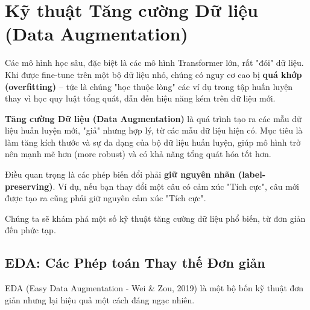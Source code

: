 
\section{Kỹ thuật Tăng cường Dữ liệu (Data Augmentation)}
\label{sec:data_augmentation}

\begin{tcolorbox}[
    title=Vấn đề: "Cơn đói" Dữ liệu,
    colback=red!5!white, colframe=red!75!black, fonttitle=\bfseries
]
Các mô hình học sâu, đặc biệt là các mô hình Transformer lớn, rất "đói" dữ liệu. Khi được fine-tune trên một bộ dữ liệu nhỏ, chúng có nguy cơ cao bị \textbf{quá khớp (overfitting)} -- tức là chúng "học thuộc lòng" các ví dụ trong tập huấn luyện thay vì học quy luật tổng quát, dẫn đến hiệu năng kém trên dữ liệu mới.
\end{tcolorbox}

\textbf{Tăng cường Dữ liệu (Data Augmentation)} là quá trình tạo ra các mẫu dữ liệu huấn luyện mới, "giả" nhưng hợp lý, từ các mẫu dữ liệu hiện có. Mục tiêu là làm tăng kích thước và sự đa dạng của bộ dữ liệu huấn luyện, giúp mô hình trở nên mạnh mẽ hơn (more robust) và có khả năng tổng quát hóa tốt hơn.

Điều quan trọng là các phép biến đổi phải \textbf{giữ nguyên nhãn (label-preserving)}. Ví dụ, nếu bạn thay đổi một câu có cảm xúc "Tích cực", câu mới được tạo ra cũng phải giữ nguyên cảm xúc "Tích cực".

Chúng ta sẽ khám phá một số kỹ thuật tăng cường dữ liệu phổ biến, từ đơn giản đến phức tạp.

\subsection{EDA: Các Phép toán Thay thế Đơn giản}
\label{ssec:eda}
EDA (Easy Data Augmentation - Wei \& Zou, 2019) là một bộ bốn kỹ thuật đơn giản nhưng lại hiệu quả một cách đáng ngạc nhiên.

